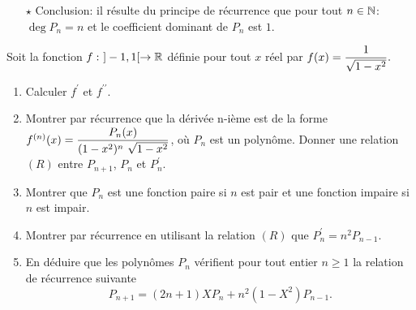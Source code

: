 \documentclass[a4paper, 11pt,reqno]{article}
\begin{document}
\begin{correction}
\begin{enumerate}
\begin{itemize}
\begin{itemize}
				            \item[$\star$] Conclusion: il r\'esulte du principe de r\'ecurrence que pour tout $n\in\mathbb{N}$: $\deg{P_n}=n$ et le coefficient dominant de $P_n$ est $1$.
			            \end{itemize}
		      \end{itemize}
	\end{enumerate}
\end{correction}





\begin{exercice}  \;
	Soit la fonction $f:\ \rbrack -1,1\lbrack\rightarrow\mathbb{R}$ d\'efinie pour tout $x$ r\'eel par $f(x)=\displaystyle\frac{1}{\sqrt{1-x^2}}.$
	\begin{enumerate}
		\item Calculer $f^{\prime}$ et $f^{\prime\prime}$.
		\item Montrer par r\'ecurrence que la d\'eriv\'ee n-i\`eme est de la forme $f^{(n)}(x)=\ddp\frac{P_n(x)}{(1-x^2)^n\ \sqrt{1-x^2}}$, o\`u $P_n$ est un polyn\^ome. Donner une relation $(R)$ entre $P_{n+1}$, $P_n$ et $P_n^{\prime}$.
		\item Montrer que $P_n$ est une fonction paire si $n$ est pair et une fonction impaire si $n$ est impair.
		\item Montrer par r\'ecurrence en utilisant la relation $(R)$ que $P_n^{\prime}=n^2P_{n-1}.$
		\item En d\'eduire que les polyn\^omes $P_n$ v\'erifient pour tout entier $n\geq 1$ la relation de r\'ecurrence suivante
		      $$P_{n+1}=(2n+1)XP_n+n^2(1-X^2)P_{n-1}.$$
	\end{enumerate}
\end{exercice}
\end{document}
